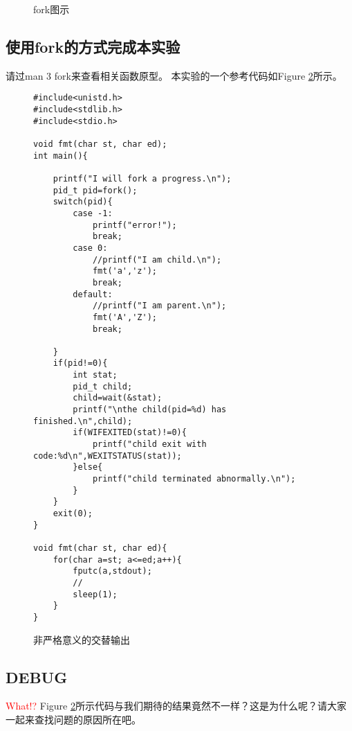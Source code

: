 \begin{figure}
\caption{fork图示}
\label{pro-fork}
\end{figure}
\subsection{使用fork的方式完成本实验}
请过man 3 fork来查看相关函数原型。
本实验的一个参考代码如Figure \ref{pro-ps}所示。
\begin{figure}
\begin{verbatim}
#include<unistd.h>
#include<stdlib.h>
#include<stdio.h>

void fmt(char st, char ed);
int main(){
	
	printf("I will fork a progress.\n");
	pid_t pid=fork();
	switch(pid){
		case -1:
			printf("error!");
			break;
		case 0:
			//printf("I am child.\n");
			fmt('a','z');
			break;
		default:
			//printf("I am parent.\n");
			fmt('A','Z');
			break;
			
	}
	if(pid!=0){
		int stat;
		pid_t child;
		child=wait(&stat);
		printf("\nthe child(pid=%d) has finished.\n",child);
		if(WIFEXITED(stat)!=0){
			printf("child exit with code:%d\n",WEXITSTATUS(stat));
		}else{
			printf("child terminated abnormally.\n");
		}
	}
	exit(0);
}

void fmt(char st, char ed){
	for(char a=st; a<=ed;a++){
		fputc(a,stdout);
		//
		sleep(1);
	}
}
\end{verbatim}
\caption{非严格意义的交替输出}
\label{pro-ps}
\end{figure}

\subsection{DEBUG}
\textcolor{red}{What!?}
Figure \ref{pro-ps}所示代码与我们期待的结果竟然不一样？这是为什么呢？请大家一起来查找问题的原因所在吧。